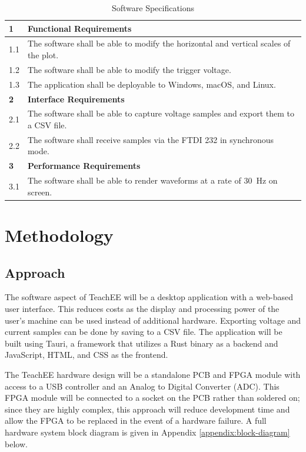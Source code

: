 \documentclass[letterpaper,12pt]{article}
\begin{document}
\begin{table}[h!]
    \caption{Software Specifications}
    \begin{tabularx}{\textwidth}{l|l}
        \textbf{1} & \textbf{Functional Requirements}\\
        \hline
        1.1 & The software shall be able to modify the horizontal and vertical scales of the plot. \\
        1.2 & The software shall be able to modify the trigger voltage. \\
        1.3 & The application shall be deployable to Windows, macOS, and Linux. \\
        \hline
        \textbf{2} & \textbf{Interface Requirements} \\
        \hline
        2.1 & The software shall be able to capture voltage samples and export them to a CSV file. \\
        2.2 & The software shall receive samples via the FTDI 232 in synchronous mode. \\
        \hline
        \textbf{3} & \textbf{Performance Requirements} \\
        \hline
        3.1 & The software shall be able to render waveforms at a rate of \SI{30}{\hertz} on screen.
    \end{tabularx} 
\label{sw:specs-table}
\end{table}


\section{Methodology} %

\subsection{Approach}

The software aspect of TeachEE will be a desktop application
with a web-based user interface. This reduces costs as the display and
processing power of the user's machine can be used instead of additional
hardware. Exporting voltage and current samples can be done
by saving to a CSV file. The application will be built using
Tauri, a framework that utilizes a Rust binary as a backend and JavaScript,
HTML, and CSS as the frontend.

The TeachEE hardware design will be a standalone PCB and FPGA module with
access to a USB controller and an Analog to Digital Converter (ADC). This FPGA
module will be connected to a socket on the PCB rather than soldered on; since
they are highly complex, this approach will reduce development time and allow
the FPGA to be replaced in the event of a hardware failure. A full hardware
system block diagram is given in Appendix \ref{appendix:block-diagram} below.
\end{document}
